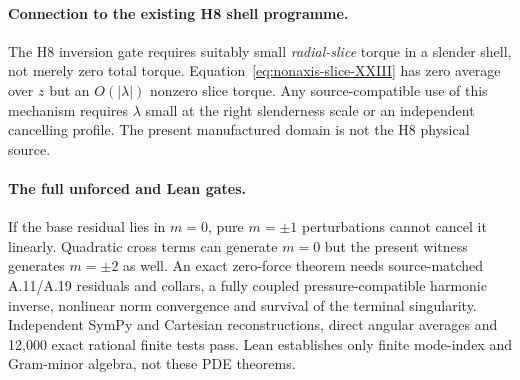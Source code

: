 \paragraph{Connection to the existing H8 shell programme.}
The H8 inversion gate requires suitably small \emph{radial-slice}
torque in a slender shell, not merely zero total torque.
Equation~\eqref{eq:nonaxis-slice-XXIII} has zero average over $z$
but an $O(|\lambda|)$ nonzero slice torque. Any source-compatible
use of this mechanism requires $\lambda$ small at the right
slenderness scale or an independent cancelling profile.
The present manufactured domain is not the H8 physical source.

\paragraph{The full unforced and Lean gates.}
If the base residual lies in $m=0$, pure $m=\pm1$ perturbations
cannot cancel it linearly. Quadratic cross terms can generate
$m=0$ but the present witness generates $m=\pm2$ as well.
An exact zero-force theorem needs source-matched A.11/A.19
residuals and collars, a fully coupled pressure-compatible
harmonic inverse, nonlinear norm convergence and survival of
the terminal singularity. Independent SymPy and Cartesian
reconstructions, direct angular averages and 12,000 exact
rational finite tests pass. Lean establishes only finite
mode-index and Gram-minor algebra, not these PDE theorems.

